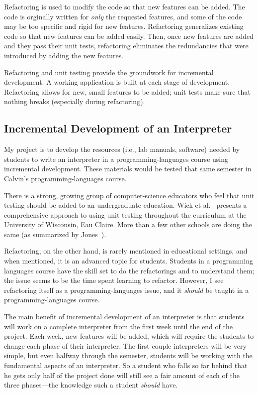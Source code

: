 \documentclass{article}
\begin{document}
Refactoring is used to modify the code so that new features can be added.  The code is orginally written for \emph{only} the requested features, and some of the code may be too specific and rigid for new features.  Refactoring generalizes existing code so that new features can be added easily.  Then, once new features are added and they pass their unit tests, refactoring eliminates the redundancies that were introduced by adding the new features.

Refactoring and unit testing provide the groundwork for incremental development.  A working application is built at each stage of development.  Refactoring allows for new, small features to be added; unit tests make sure that nothing breaks (especially during refactoring).

\subsection*{Incremental Development of an Interpreter}

My project is to develop the resources (i.e., lab manuals, software) needed by students to write an interpreter in a programming-languages course using incremental development.  These materials would be tested that same semester in Calvin's programming-languages course.

There is a strong, growing group of computer-science educators who feel that unit testing should be added to an undergraduate education.  Wick et al.~\cite{eauclaire} presents a comprehensive approach to using unit testing throughout the curriculum at the University of Wisconsin, Eau Claire.  More than a few other schools are doing the same (as summarized by Jones~\cite{jones}).

Refactoring, on the other hand, is rarely mentioned in educational settings, and when mentioned, it is an advanced topic for students.  Students in a programming languages course have the skill set to do the refactorings and to understand them; the issue seems to be the time spent learning to refactor.  However, I see refactoring itself as a programming-languages issue, and it \emph{should} be taught in a programming-languages course.

The main benefit of incremental development of an interpreter is that students will work on a complete interpreter from the first week until the end of the project.  Each week, new features will be added, which will require the students to change each phase of their interpreter.  The first couple interpreters will be very simple, but even halfway through the semester, students will be working with the fundamental aspects of an interpreter.  So a student who falls so far behind that he gets only half of the project done will still see a fair amount of each of the three phases---the knowledge such a student \emph{should} have.
\end{document}
